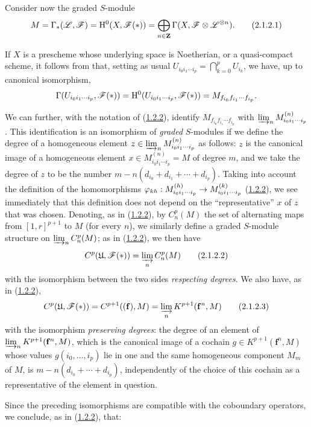 \begin{env}[2.1.2]
\label{III.2.1.2}
Consider now the graded $S$-module 
\[
\label{III.2.1.2.1}
  M = \Gamma_*(\mathscr{L},\mathscr{F}) = \mathrm{H}^0(X,\mathscr{F}(*)) = \bigoplus_{n\in\mathbf{Z}} \Gamma(X,\mathscr{F}\otimes\mathscr{L}^{\otimes n}).
  \tag{2.1.2.1}
\]

If $X$ is a prescheme whose underlying space is Noetherian, or a quasi-compact scheme, it follows from  that, setting as usual $U_{i_0 i_1\cdots i_p} = \bigcap_{k=0}^p U_{i_k}$, we have, up to canonical isomorphism,
\[
  \Gamma(U_{i_0 i_1\cdots i_p},\mathscr{F}(*)) = \mathrm{H}^0(U_{i_0 i_1\cdots i_p},\mathscr{F}(*)) = M_{f_{i_0}f_{i_1}\cdots f_{i_p}}.
\]

We can further, with the notation of (\hyperref[III.1.2.2]{1.2.2}), identify $M_{f_{i_0}f_{i_1}\cdots f_{i_p}}$ with $\varinjlim_n M_{i_0 i_1\cdots i_p}^{(n)}$.
This identification is an isomorphism of \emph{graded} $S$-modules if we define the degree of a homogeneous element $z\in\varinjlim_n M_{i_0 i_1\cdots i_p}^{(n)}$ as follows: $z$ is the canonical image of a homogeneous element $x\in M_{i_0 i_1\cdots i_p}^{(n)} = M$ of degree $m$, and we take the degree of $z$ to be the number $m-n(d_{i_0}+d_{i_1}+\cdots+d_{i_p})$.
Taking into account the definition of the homomorphisms $\varphi_{kh}:M_{i_0 i_1\cdots i_p}^{(h)}\to M_{i_0 i_1\cdots i_p}^{(k)}$ (\hyperref[III.1.2.2]{1.2.2}), we see immediately that this definition does not depend on the ``representative'' $x$ of $z$ that was chosen.
Denoting, as in (\hyperref[III.1.2.2]{1.2.2}), by $C_n^p(M)$ the set of alternating maps from $[1,r]^{p+1}$ to $M$ (for every $n$), we similarly define a graded $S$-module structure on $\varinjlim_n C_n^p(M)$; as in (\hyperref[III.1.2.2]{1.2.2}), we then have
\[
\label{III.2.1.2.2}
  C^p(\mathfrak{U},\mathscr{F}(*)) = \varinjlim_n C_n^p(M)
  \tag{2.1.2.2}
\]
with the isomorphism between the two sides \emph{respecting degrees}.
We also have, as in (\hyperref[III.1.2.2]{1.2.2}),
\[
\label{III.2.1.2.3}
  C^p(\mathfrak{U},\mathscr{F}(*)) = C^{p+1}((\mathbf{f}),M) = \varinjlim_n K^{p+1}(\mathbf{f}^n,M)
  \tag{2.1.2.3}
\]
with the isomorphism \emph{preserving degrees}: the degree of an element of $\varinjlim_n K^{p+1}(\mathbf{f}^n,M)$, which is the canonical image of a cochain $g\in K^{p+1}(\mathbf{f}^n,M)$ whose values $g(i_0,\dots,i_p)$ lie in one and the same homogeneous component $M_m$ of $M$, is $m-n(d_{i_0}+\cdots+d_{i_p})$, independently of the choice of this cochain as a representative of the element in question.

Since the preceding isomorphisms are compatible with the coboundary operators, we conclude, as in (\hyperref[III.1.2.2]{1.2.2}), that:
\end{env}

